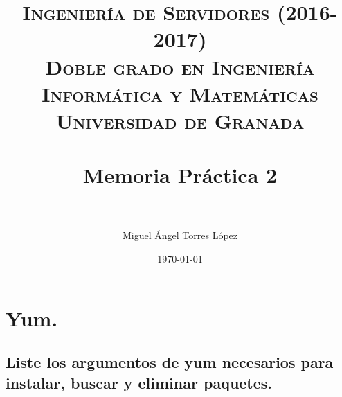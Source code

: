 


\title{	
\normalfont \normalsize 
\textsc{\textbf{Ingeniería de Servidores (2016-2017)} \\ Doble grado en Ingeniería Informática y Matemáticas \\ Universidad de Granada} \\ [25pt] %
\horrule{2pt} \\[0.4cm] %
\huge Memoria Práctica 2 \\ %
\horrule{2pt} \\[0.5cm] %
}

\author{Miguel Ángel Torres López} %

\date{\normalsize\today} %




\maketitle %

\newpage %

\tableofcontents %

\newpage

\listoffigures

\listoftables

\newpage


\section{Yum.}
\subsection{Liste los argumentos de yum necesarios para instalar, buscar y eliminar paquetes.}

